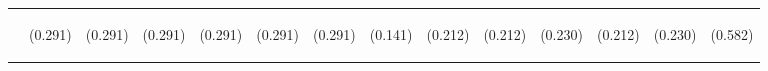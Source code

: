 \begin{center}
\begin{tabular}{lccccccccccccc}
 & \begin{footnotesize}(0.291)\end{footnotesize} & \begin{footnotesize}(0.291)\end{footnotesize} & \begin{footnotesize}(0.291)\end{footnotesize} & \begin{footnotesize}(0.291)\end{footnotesize} & \begin{footnotesize}(0.291)\end{footnotesize} & \begin{footnotesize}(0.291)\end{footnotesize} & \begin{footnotesize}(0.141)\end{footnotesize} & \begin{footnotesize}(0.212)\end{footnotesize} & \begin{footnotesize}(0.212)\end{footnotesize} & \begin{footnotesize}(0.230)\end{footnotesize} & \begin{footnotesize}(0.212)\end{footnotesize} & \begin{footnotesize}(0.230)\end{footnotesize} & \begin{footnotesize}(0.582)\end{footnotesize} \\

\end{tabular}
\end{center}
